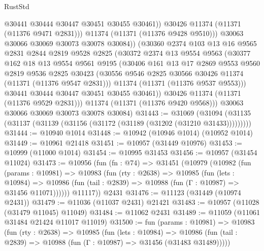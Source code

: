 \begin{lexlean}{RustStd}
\begin{coremodule}
                    @30441
                    @30444
                    @30447
                    @30451
                    @30455
                    @30461))
                @30426
                @11374
                (@11371 (@11376 @9471 @2831)))
              @11374
              (@11371 (@11376 @9428 @9510)))
            @30063
            @30066
            @30069
            @30073
            @30078
            @30084))
        (@30360
          @2374
          @103
          @13
          @16
          @9565
          @2831
          @2844
          @2819
          @9528
          @2825
          (@30372
            @2374
            @13
            @9554
            @9563
            (@30377
              @162
              @18
              @13
              @9554
              @9561
              @9195
              (@30406
                @161
                @13
                @17
                @2869
                @9553
                @9560
                @2819
                @9536
                @2825
                @30423
                (@30556 @9546 @2825 @30566 @30426 @11374 (@11371 (@11376 @9547 @2831)))
                @11374
                (@11371 (@11376 @9537 @9553)))
              @30441
              @30444
              @30447
              @30451
              @30455
              @30461))
          @30426
          @11374
          (@11371 (@11376 @9529 @2831)))
        @11374
        (@11371 (@11376 @9420 @9568)))
      @30063
      @30066
      @30069
      @30073
      @30078
      @30084)
@31443 := @31069
    (@31094 (@31135 (@31137 (@31139 (@31156 (@31172 (@31189 (@31202 (@31210 @31433)))))))))
@31444 := @10940 @1014
@31448 := @10942 (@10946 @1014) (@10952 @1014)
@31449 := @10961 @21418
@31451 := @10957 (@31449 @10976)
@31453 := @10999 (@11000 @1014)
@31454 := @10995 @31453
@31456 := @10957 (@31454 @11024)
@31473 := @10956
    (fun (fn : @74) =>
    @31451
      (@10979
        (@10982
          (fun (params : @10981) =>
          @10983
            (fun (rty : @2638) =>
            @10985
              (fun (lets : @10984) =>
              @10986 (fun (tail : @2839) => @10988 (fun (Γ : @10987) => @31456 @11071))))))
        @11117))
    @2431
@31476 := @11123 (@31449 (@10974 @2431))
@31479 := @11036 (@11037 @2431) @21421
@31483 := @10957 (@11028 (@31479 @11045) @11049)
@31484 := @11062 @2431
@31489 := @11059 (@11061 @31484 @21424 @11017 @11019)
@31500 := fun (params : @10981) =>
  @10983
    (fun (rty : @2638) =>
    @10985
      (fun (lets : @10984) =>
      @10986 (fun (tail : @2839) => @10988 (fun (Γ : @10987) => @31456 (@31483 @31489)))))

\end{coremodule}
\end{lexlean}
